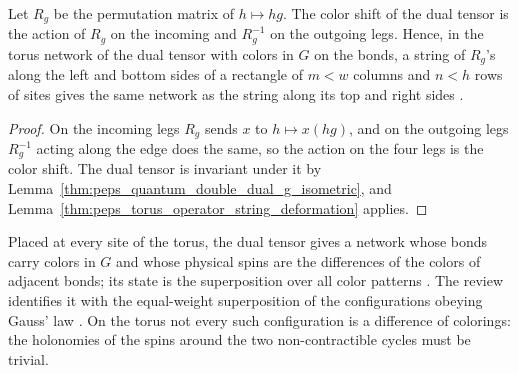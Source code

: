 \begin{corollary}%
    \label{cor:peps_quantum_double_dual_string_deformation}
    \leanok
    Let $R_g$ be the permutation matrix of $h\mapsto hg$. The color shift of
    the dual tensor is the action of $R_g$ on the incoming and $R_g^{-1}$ on
    the outgoing legs. Hence, in the torus network of the dual tensor with
    colors in $G$ on the bonds, a string of $R_g$'s along the left and bottom
    sides of a rectangle of $m<w$ columns and $n<h$ rows of sites gives the
    same network as the string along its top and right sides
    \cite[Section~``Two dimensions: $G$-injective PEPS'',
        eq.~(2d:move-strings)]{Schuch2010PEPS}.
\end{corollary}

\begin{proof}\leanok
    On the incoming legs $R_g$ sends $x$ to $h\mapsto x(hg)$, and on the
    outgoing legs $R_g^{-1}$ acting along the edge does the same, so the
    action on the four legs is the color shift. The dual tensor is invariant
    under it by Lemma~\ref{thm:peps_quantum_double_dual_g_isometric}, and
    Lemma~\ref{thm:peps_torus_operator_string_deformation} applies.
\end{proof}

Placed at every site of the torus, the dual tensor gives a network whose
bonds carry colors in $G$ and whose physical spins are the differences of the
colors of adjacent bonds; its state is the superposition over all color
patterns \cite[Section~``Examples'', ``The double models'']{Schuch2010PEPS}.
The review identifies it with the equal-weight superposition of the
configurations obeying Gauss' law \cite[Appendix~A, ``The Toric Code and
    quantum double models'']{Cirac2021Matrix}. On the torus not every such
configuration is a difference of colorings: the holonomies of the spins
around the two non-contractible cycles must be trivial.

